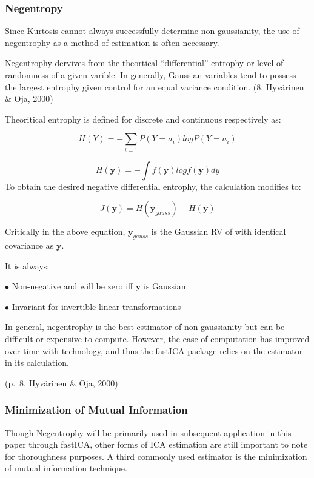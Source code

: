 \documentclass[12pt,twoside]{amherstthesis}
\begin{document}
  \subsubsection{Negentropy}\label{negentropy}
  
  Since Kurtosis cannot always successfully determine non-gaussianity, the
  use of negentrophy as a method of estimation is often necessary.
  
  Negentrophy dervives from the theortical ``differential'' entrophy or
  level of randomness of a given varible. In generally, Gaussian variables
  tend to possess the largest entrophy given control for an equal variance
  condition. (8, Hyvärinen \& Oja, 2000)
  
  Theoritical entrophy is defined for discrete and continuous respectively
  as:
  
  \[H(Y) = -\sum_{i=1}P(Y = a_i)log P(Y = a_i)\]
  
  \[H(\textbf{y}) = -\int f(\textbf{y})logf(\textbf{y})dy\] To obtain the
  desired negative differential entrophy, the calculation modifies to:
  
  \[ J(\textbf{y}) = H(\textbf{y}_{gauss}) -H(\textbf{y})\]
  
  Critically in the above equation, \(\textbf{y}_\textit{gauss}\) is the
  Gaussian RV of with identical covariance as \(\textbf{y}\).
  
  It is always:
  
  \(\bullet\) Non-negative and will be zero iff \(\textbf{y}\) is
  Gaussian.
  
  \(\bullet\) Invariant for invertible linear transformations
  
  In general, negentrophy is the best estimator of non-gaussianity but can
  be difficult or expensive to compute. However, the ease of computation
  has improved over time with technology, and thus the fastICA package
  relies on the estimator in its calculation.
  
  (p.~8, Hyvärinen \& Oja, 2000)
  
  \subsubsection{Minimization of Mutual
  Information}\label{minimization-of-mutual-information}
  
  Though Negentrophy will be primarily used in subsequent application in
  this paper through fastICA, other forms of ICA estimation are still
  important to note for thoroughness purposes. A third commonly used
  estimator is the minimization of mutual information technique.
  
\end{document}
